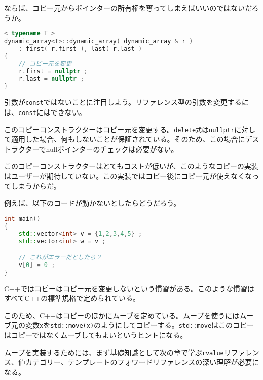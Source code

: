 ならば、コピー元からポインターの所有権を奪ってしまえばいいのではないだろうか。

\begin{lstlisting}[language={C++}]
 < typename T >
dynamic_array<T>::dynamic_array( dynamic_array & r )
    : first( r.first ), last( r.last ) 
{
    // コピー元を変更
    r.first = nullptr ;
    r.last = nullptr ;
}
\end{lstlisting}

引数が\texttt{const}ではないことに注目しよう。リファレンス型の引数を変更するには、\texttt{const}にはできない。

このコピーコンストラクターはコピー元を変更する。\texttt{delete式}は\texttt{nullptr}に対して適用した場合、何もしないことが保証されている。そのため、この場合にデストラクターでnullポインターのチェックは必要がない。

このコピーコンストラクターはとてもコストが低いが、このようなコピーの実装はユーザーが期待していない。この実装ではコピー後にコピー元が使えなくなってしまうからだ。

例えば、以下のコードが動かないとしたらどうだろう。

\ifTombow\pagebreak\fi
\begin{lstlisting}[language={C++}]
int main()
{
    std::vector<int> v = {1,2,3,4,5} ;
    std::vector<int> w = v ;

    // これがエラーだとしたら？
    v[0] = 0 ; 
}
\end{lstlisting}

C++ではコピーはコピー元を変更しないという慣習がある。このような慣習はすべてC++の標準規格で定められている。

このため、C++はコピーのほかにムーブを定めている。ムーブを使うにはムーブ元の変数\texttt{x}を\texttt{std::move(x)}のようにしてコピーする。\texttt{std::move}はこのコピーはコピーではなくムーブしてもよいというヒントになる。

ムーブを実装するためには、まず基礎知識として次の章で学ぶ\texttt{rvalue}リファレンス、値カテゴリー、テンプレートのフォワードリファレンスの深い理解が必要になる。
